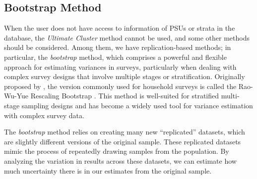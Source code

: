 \documentclass[
  12pt,
]{book}
\begin{document}
\hypertarget{bootstrap-method}{%
\subsection{Bootstrap Method}\label{bootstrap-method}}

When the user does not have access to information of PSUs or strata in the database, the \emph{Ultimate Cluster} method cannot be used, and some other methods should be considered. Among them, we have replication-based methods; in particular, the \emph{bootstrap} method, which comprises a powerful and flexible approach for estimating variances in surveys, particularly when dealing with complex survey designs that involve multiple stages or stratification. Originally proposed by \citet{Efron1979}, the version commonly used for household surveys is called the Rao-Wu-Yue Rescaling Bootstrap \citep{Rao1992}. This method is well-suited for stratified multi-stage sampling designs and has become a widely used tool for variance estimation with complex survey data.

The \emph{bootstrap} method relies on creating many new ``replicated'' datasets, which are slightly different versions of the original sample. These replicated datasets mimic the process of repeatedly drawing samples from the population. By analyzing the variation in results across these datasets, we can estimate how much uncertainty there is in our estimates from the original sample.
\end{document}
